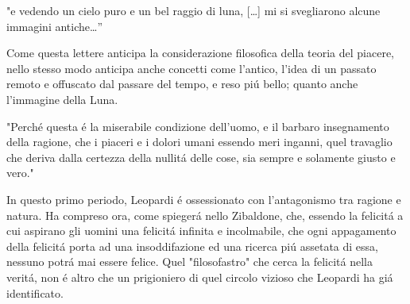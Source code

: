 \documentclass{report}
\begin{document}
"e vedendo un cielo puro e un bel raggio di luna, [\dots] mi si svegliarono alcune immagini antiche\dots''

Come questa lettere anticipa la considerazione filosofica della teoria del piacere, nello stesso modo anticipa anche concetti come l'antico, l'idea di un passato remoto e offuscato dal passare del tempo, e reso piú bello; quanto anche l'immagine della Luna.

"Perché questa é la miserabile condizione dell'uomo, e il barbaro insegnamento della ragione, che i piaceri e i dolori umani essendo meri inganni, quel travaglio che deriva dalla certezza della nullitá delle cose, sia sempre e solamente giusto e vero."

In questo primo periodo, Leopardi é ossessionato con l'antagonismo tra ragione e natura.  Ha compreso ora, come spiegerá nello Zibaldone, che, essendo la felicitá a cui aspirano gli uomini una felicitá infinita e incolmabile, che ogni appagamento della felicitá porta ad una insoddifazione ed una ricerca piú assetata di essa, nessuno potrá mai essere felice. Quel "filosofastro" che cerca la felicitá nella veritá, non é altro che un prigioniero di quel circolo vizioso che Leopardi ha giá identificato.
\end{document}
